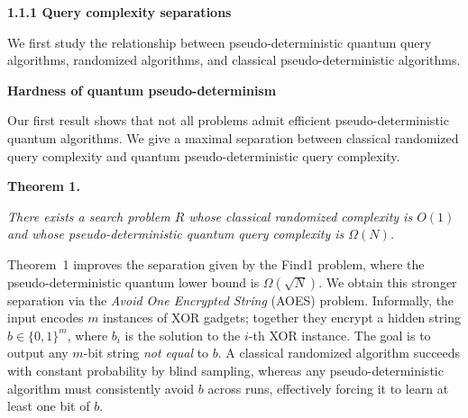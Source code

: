 \par\medskip\noindent\textbf{
1.1.1 Query complexity separations}\par




We first study the relationship between pseudo-deterministic quantum query algorithms, randomized algorithms, and classical pseudo-deterministic algorithms.\par




\par\medskip\noindent\textbf{Hardness of quantum pseudo-determinism}\par




Our first result shows that not all problems admit efficient pseudo-deterministic quantum algorithms. We give a maximal separation between classical randomized query complexity and quantum pseudo-deterministic query complexity.\par





\par\medskip\noindent\textbf{
\textbf{Theorem 1}\textbf{.}
}\par



\emph{There exists a search problem ${R}$ whose classical randomized complexity is $O(1)$ and whose pseudo-deterministic quantum query complexity is $\Omega(N)$.}\par






Theorem 1 improves the separation given by the Find1 problem, where the pseudo-deterministic quantum lower bound is $\Omega(\sqrt{N})$.
We obtain this stronger separation via the \emph{Avoid One Encrypted String} (AOES) problem. Informally, the input encodes $m$ instances of XOR gadgets; together they encrypt a hidden string $b\in\{0,1\}^{m}$, where $b_{i}$ is the solution to the $i$-th XOR instance. The goal is to output any $m$-bit string \emph{not equal} to $b$. A classical randomized algorithm succeeds with constant probability by blind sampling, whereas any pseudo-deterministic algorithm must consistently avoid $b$ across runs, effectively forcing it to learn at least one bit of $b$.\par





